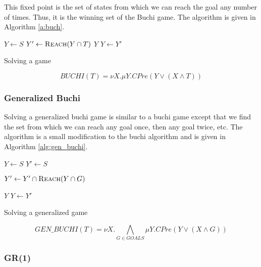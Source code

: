 This fixed point is the set of states from which we can reach the goal any number of times. Thus, it is the winning set of the Buchi game. The algorithm is given in Algorithm \ref{a:buch}.

\begin{algorithm}[t]
\begin{algorithmic}
\State $Y \gets S$
\Loop
\State $Y' \gets \Call{Reach}{Y \cap T}$
\State\Return $Y$\EndIf
\State $Y \gets Y'$
\EndLoop
\EndFunction
\end{algorithmic}
\caption{Solving a \buchi game}
\label{a:buchi}
\end{algorithm}

\begin{equation}
\mathit{BUCHI}(T) = \nu X. \mu Y. CPre(Y \vee (X \wedge T))
\label{eqn:mu_buchi}
\end{equation}

\subsubsection{Generalized Buchi}

Solving a generalized buchi game is similar to a buchi game except that we find the set from which we can reach any goal once, then any goal twice, etc. The algorithm is a small modification to the buchi algorithm and is given in Algorithm \ref{alg:gen_buchi}.

\begin{algorithm}[t]
\begin{algorithmic}
\State $Y \gets S$
\Loop
\State $Y' \gets S$

\State $Y' \gets Y' \cap \Call{Reach}{Y \cap G}$
\EndFor

\State\Return $Y$\EndIf
\State $Y \gets Y'$

\EndLoop
\EndFunction
\end{algorithmic}
\caption{Solving a generalized \buchi game}
\label{alg:gen_buchi}
\end{algorithm}

\begin{equation}
    \mathit{GEN\_BUCHI}(T) = \nu X. \bigwedge_{G \in GOALS} \mu Y. CPre(Y \vee (X \wedge G))
\label{eqn:mu_buchi}
\end{equation}

\subsubsection{GR(1)}

